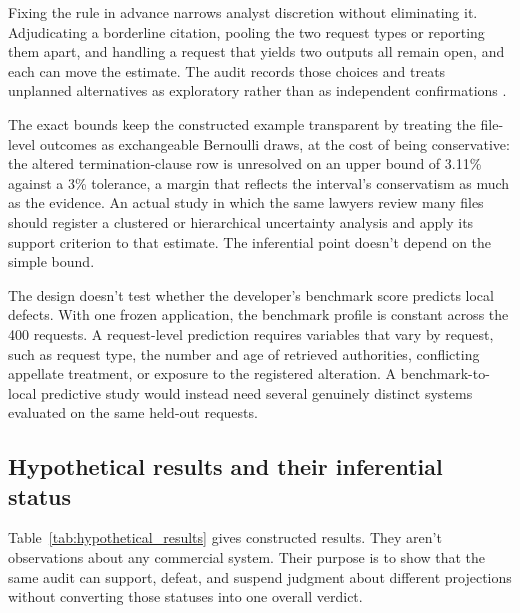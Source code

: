 \documentclass[12pt]{article}
\begin{document}
Fixing the rule in advance narrows analyst discretion without eliminating it. Adjudicating a borderline citation, pooling the two request types or reporting them apart, and handling a request that yields two outputs all remain open, and each can move the estimate. The audit records those choices and treats unplanned alternatives as exploratory rather than as independent confirmations \citep{GelmanLoken2013}.

The exact bounds keep the constructed example transparent by treating the file-level outcomes as exchangeable Bernoulli draws, at the cost of being conservative: the altered termination-clause row is unresolved on an upper bound of 3.11\% against a 3\% tolerance, a margin that reflects the interval's conservatism as much as the evidence. An actual study in which the same lawyers review many files should register a clustered or hierarchical uncertainty analysis and apply its support criterion to that estimate. The inferential point doesn't depend on the simple bound.

The design doesn't test whether the developer's benchmark score predicts local defects. With one frozen application, the benchmark profile is constant across the 400 requests. A request-level prediction requires variables that vary by request, such as request type, the number and age of retrieved authorities, conflicting appellate treatment, or exposure to the registered alteration. A benchmark-to-local predictive study would instead need several genuinely distinct systems evaluated on the same held-out requests.

\subsection{Hypothetical results and their inferential status}\label{ssec:legal_results}

Table~\ref{tab:hypothetical_results} gives constructed results. They aren't observations about any commercial system. Their purpose is to show that the same audit can support, defeat, and suspend judgment about different projections without converting those statuses into one overall verdict.
\end{document}
